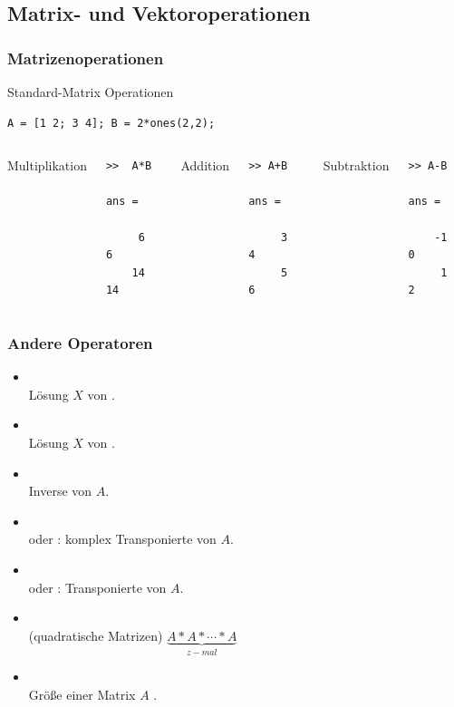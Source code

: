 \documentclass[hyperref={xetex}]{beamer}
\begin{document}
\subsection{Matrix- und Vektoroperationen}
%
%
\begin{frame}[fragile]\frametitle{Matrizenoperationen}

Standard-Matrix Operationen \mcode{+,-,*}
\begin{lstlisting}
A = [1 2; 3 4]; B = 2*ones(2,2);
\end{lstlisting}
\begin{columns}[t]%
%
Multiplikation
\begin{lstlisting}
>>  A*B

ans =

     6     6
    14    14
\end{lstlisting}
%
Addition
\begin{lstlisting}
>> A+B

ans =

     3     4
     5     6
\end{lstlisting}
%
Subtraktion
\begin{lstlisting}
>> A-B

ans =

    -1     0
     1     2
\end{lstlisting}
\end{columns}
\end{frame}
%
%
\begin{frame}[fragile]\frametitle{Andere Operatoren}
\begin{itemize}
\item {}\\ Lösung $X$ von . \\

\item {}\\ Lösung $X$ von .\\

\item {}\\ Inverse von $A$.\\

\item {}\\ oder : komplex Transponierte von $A$. \\

\item {}\\ oder : Transponierte von $A$. \\

\item {}\\ (quadratische Matrizen) $\underbrace{A*A*\cdots *A}_{z-mal}$ \\

\item {}\\ Gr\"o{\ss}e einer Matrix $A$ . 
\end{itemize}
\end{frame}
\end{document}
